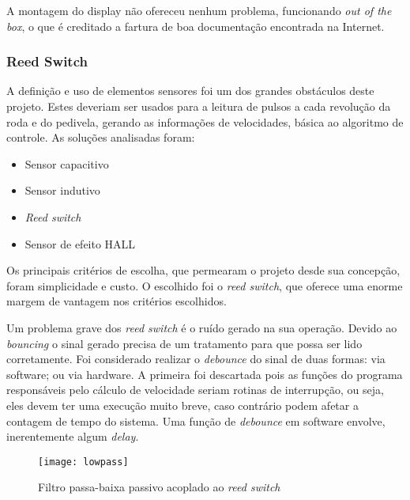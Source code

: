 \documentclass[a4paper,11pt]{article}
\begin{document}
A montagem do display não ofereceu nenhum problema, funcionando \textit{out of
the box}, o que é creditado a fartura de boa documentação encontrada na
Internet.

\subsubsection{Reed Switch}
\label{sec:reed}
A definição e uso de elementos sensores foi um dos grandes obstáculos deste
projeto. Estes deveriam ser usados para a leitura de pulsos a cada revolução da
roda e do pedivela, gerando as informações de velocidades, básica ao algoritmo
de controle. As soluções analisadas foram:
\begin{itemize}
 \item Sensor capacitivo
 \item Sensor indutivo
 \item \textit{Reed switch}
 \item Sensor de efeito HALL
\end{itemize}
Os principais critérios de escolha, que permearam o projeto desde sua concepção,
foram simplicidade e custo. O escolhido foi o  \textit{reed switch}, que
oferece uma enorme margem de vantagem nos critérios escolhidos.

Um problema grave dos \textit{reed switch} é o ruído gerado na
sua operação. Devido ao \textit{bouncing}\cite{reed} o sinal gerado precisa de
um tratamento para que possa ser lido corretamente. Foi considerado realizar o
\textit{debounce} do sinal de duas formas: via software; ou via hardware. A
primeira foi descartada pois as funções do programa responsáveis pelo
cálculo de velocidade seriam rotinas de interrupção, ou seja, eles devem ter uma
execução muito breve, caso contrário podem afetar a contagem de tempo do
sistema. Uma função de \textit{debounce} em software envolve, inerentemente
algum \textit{delay}.

\begin{figure}[ht]
 \begin{center}
  \texttt{[image: lowpass]}
 \end{center}
 \caption{Filtro passa-baixa passivo acoplado ao \textit{reed switch}}
 \label{fig:lowpass}
\end{figure}
\end{document}
